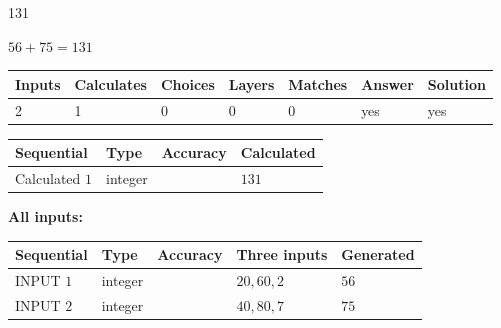 \documentclass[12pt]{article}
\begin{document}
 

131
 
 
\noindent{}
 
 

 
 
 
\noindent{}
 
 

$ %
56 +  %
75=   %
131$
 
 
\noindent{}
 
 

 
   
   
   
   
\noindent\begin{tabular}{|l|l|l|l|l|l|l|}
 \hline
Inputs & Calculates & Choices & Layers & Matches & Answer & Solution \\ \hline
 2  & 
 1  & 
 0
  & 
 0  & 
 0  & 
  yes & 
  yes 
  \\ \hline
 \end{tabular}
   
   
   
   
\noindent{}
   
   
  
  
\noindent\begin{tabular}{|l|l|l|l|}
\hline
 Sequential & Type & Accuracy & Calculated \\ 
\hline
 
 
  Calculated $  1 $ & integer &  & 
  $ 131 $ 
 \\  \hline  
 \end{tabular}
   
   
   
   
\noindent\vspace{0.1in}\hspace{-0.08in} {\textbf{\Large{All inputs: }}}
   
   
  
  
\noindent\begin{tabular}{|l|l|l|l|l|}
\hline
 Sequential & Type & Accuracy & Three inputs & Generated \\ 
\hline
 
 
  INPUT $  1 $ & integer &  & $
 20
 , 
 60
 , 
 2
 $ & $ 56 $ 
 \\  \hline  
 
 
  INPUT $  2 $ & integer &  & $
 40
 , 
 80
 , 
 7
 $ & $ 75 $ 
 \\  \hline  
 \end{tabular}
   
\end{document}

